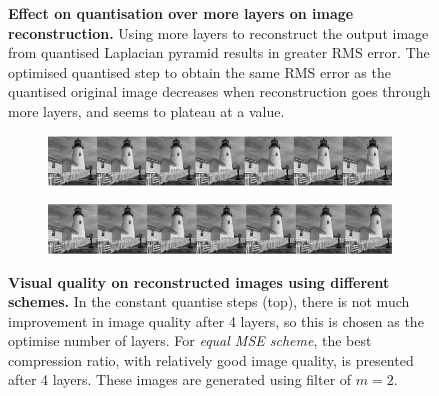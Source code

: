 \documentclass[a4paper, 11pt]{article}
\begin{document}
\begin{center}
\begin{figure}[h]
	\caption{\textbf{Effect on quantisation over more layers on image reconstruction.} Using more layers to reconstruct the output image from quantised Laplacian pyramid results in greater RMS error. The optimised quantised step to obtain the same RMS error as the quantised original image decreases when reconstruction goes through more layers, and seems to plateau at a value.}
\end{figure}
\begin{figure}[h]
\begin{center}
	\begin{subfigure}[b]{0.8\textwidth}
		\includegraphics[width=\textwidth]{image_const_q.jpg}
	\end{subfigure}
	\begin{subfigure}[b]{0.8\textwidth}
		\includegraphics[width=\textwidth]{image_adjust_q.jpg}
	\end{subfigure}
	\caption{\textbf{Visual quality on reconstructed images using different schemes.} In the constant quantise steps (top), there is not much improvement in image quality after 4 layers, so this is chosen as the optimise number of layers. For \textit{equal MSE scheme}, the best compression ratio, with relatively good image quality, is presented after 4 layers. These images are generated using filter of $m = 2$.}
\end{center}

\end{figure}


\end{center}
\end{document}

